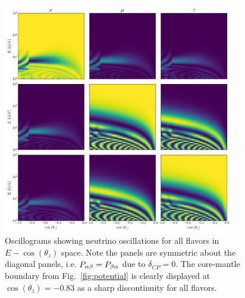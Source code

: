 \begin{figure}
    \centering
    \includegraphics[width=0.9\textwidth]{figures/oscillograms.pdf}
    \caption{Oscillograms showing neutrino oscillations for all flavors in $E - \cos(\theta_z)$ space. Note the panels are symmetric about the diagonal panels, i.e. $P_{\alpha\beta} = P_{\beta\alpha}$ due to $\delta_{CP} = 0$. The core-mantle boundary from Fig.~\ref{fig:potential} is clearly displayed at $\cos{(\theta_z)} = -0.83$ as a sharp discontinuity for all flavors.}\label{fig:oscillograms}%
\end{figure}